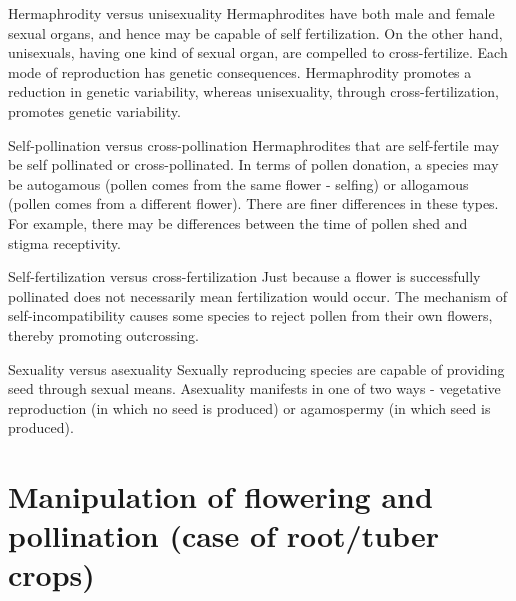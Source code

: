 \documentclass[11pt,ignorenonframetext,aspectratio=169]{beamer}
\begin{document}
\begin{frame}{}
\protect\hypertarget{section-19}{}
\begin{block}{\footnotesize Hermaphrodity versus unisexuality}
\scriptsize
Hermaphrodites have both male and female sexual organs, and hence may be capable of self fertilization. On the other hand, unisexuals, having one kind of sexual organ, are compelled to cross-fertilize. Each mode of reproduction has genetic consequences. Hermaphrodity promotes a reduction in genetic variability, whereas unisexuality, through cross-fertilization, promotes genetic variability.
\end{block}

\begin{block}{\footnotesize Self-pollination versus cross-pollination}
\scriptsize
Hermaphrodites that are self-fertile may be self pollinated or cross-pollinated. In terms of pollen donation, a species may be autogamous (pollen comes from the same flower - selfing) or allogamous (pollen comes from a different flower). There are finer differences in these types. For example, there may be differences between the time of pollen shed and stigma receptivity.
\end{block}

\begin{block}{\footnotesize Self-fertilization versus cross-fertilization}
\scriptsize
Just because a flower is successfully pollinated does not necessarily mean fertilization would occur. The mechanism of self-incompatibility causes some species to reject pollen from their own flowers, thereby promoting outcrossing.
\end{block}

\begin{block}{\footnotesize Sexuality versus asexuality}
\scriptsize
Sexually reproducing species are capable of providing seed through sexual means. Asexuality manifests in one of two ways - vegetative reproduction (in which no seed is produced) or agamospermy (in which seed is produced).
\end{block}
\end{frame}

\hypertarget{manipulation-of-flowering-and-pollination-case-of-roottuber-crops}{%
\section{Manipulation of flowering and pollination (case of root/tuber
crops)}\label{manipulation-of-flowering-and-pollination-case-of-roottuber-crops}}
\end{document}
